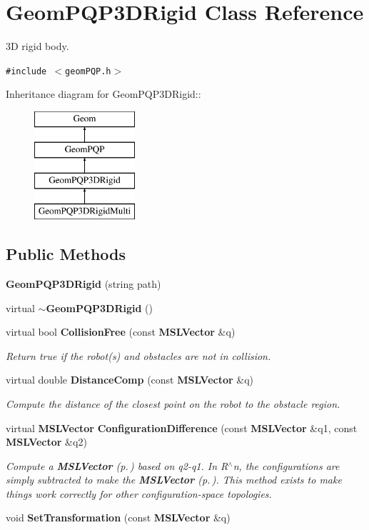 \section{Geom\-PQP3DRigid  Class Reference}
\label{classGeomPQP3DRigid}
3D rigid body. 


{\tt \#include $<$geom\-PQP.h$>$}

Inheritance diagram for Geom\-PQP3DRigid::\begin{figure}[H]
\begin{center}
\leavevmode
\includegraphics[height=4cm]{classGeomPQP3DRigid}
\end{center}
\end{figure}
\subsection*{Public Methods}
\begin{CompactItemize}
\item 
{\bf Geom\-PQP3DRigid} (string path)
\item 
virtual {\bf $\sim$Geom\-PQP3DRigid} ()
\item 
virtual bool {\bf Collision\-Free} (const {\bf MSLVector} \&q)
\begin{CompactList}\small\item\em Return true if the robot(s) and obstacles are not in collision.\item\end{CompactList}\item 
virtual double {\bf Distance\-Comp} (const {\bf MSLVector} \&q)
\begin{CompactList}\small\item\em Compute the distance of the closest point on the robot to the obstacle region.\item\end{CompactList}\item 
virtual {\bf MSLVector} {\bf Configuration\-Difference} (const {\bf MSLVector} \&q1, const {\bf MSLVector} \&q2)
\begin{CompactList}\small\item\em Compute a {\bf MSLVector} {\rm (p.\,\pageref{classMSLVector})} based on q2-q1. In R$^\wedge$n, the configurations are simply subtracted to make the {\bf MSLVector} {\rm (p.\,\pageref{classMSLVector})}. This method exists to make things work correctly for other configuration-space topologies.\item\end{CompactList}\item 
void {\bf Set\-Transformation} (const {\bf MSLVector} \&q)
\end{CompactItemize}



